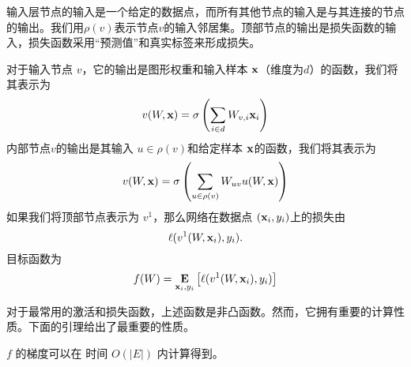 输入层节点的输入是一个给定的数据点，而所有其他节点的输入是与其连接的节点的输出。我们用$\rho(v)$表示节点$v$的输入邻居集。顶部节点的输出是损失函数的输入，损失函数采用“预测值”和真实标签来形成损失。

对于输入节点 $v$，它的输出是图形权重和输入样本 $\mathbf x$（维度为$d$）的函数，我们将其表示为
$$ v(W,\mathbf x) = \sigma \left( \sum_{i \in d} W_{v,i} \mathbf x_i \right) $$
内部节点$v$的输出是其输入 $u \in \rho(v)$和给定样本 $\mathbf x$的函数，我们将其表示为
$$ v( W,\mathbf x ) = \sigma  \left(  \sum_{u \in \rho(v)}  W_{uv} u(W,\mathbf x) \right)  $$
如果我们将顶部节点表示为 $v^{1}$，那么网络在数据点 $(\mathbf x_i,y_i)$上的损失由
$$ \ell(   v^{1} (W,\mathbf x_i) , y_i ) . $$
目标函数为
$$f(W) =  \mathop{\mbox{\bf E}}_{\mathbf x_i,y_i} \left[ \ell( v^{1} (W,\mathbf x_i) , y_i)  \right]  $$

对于最常用的激活和损失函数，上述函数是非凸函数。然而，它拥有重要的计算性质。下面的引理给出了最重要的性质。
\begin{lemma}[
反向传播引理
]
$f$ 的梯度可以在 时间 $O(|E|)$ 内计算得到。
\end{lemma}


